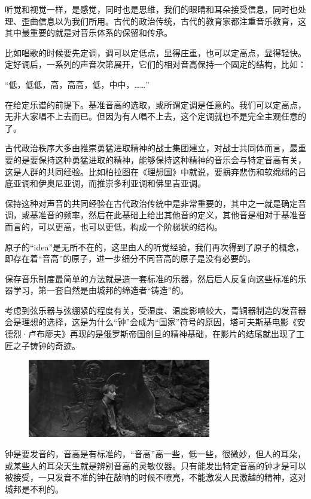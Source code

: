 听觉和视觉一样，是感觉，同时也是思维，我们的眼睛和耳朵接受信息，同时也处理、歪曲信息以为我们所用。古代的政治传统，古代的教育家都注重音乐教育，这其中最重要的就是对音乐体系的保留和传承。

比如唱歌的时候要先定调，调可以定低点，显得庄重，也可以定高点，显得轻快。定好调后，一系列的声音次第展开，它们的相对音高保持一个固定的结构，比如：

“低，低低，高，高高，低，中中，……”

在给定乐谱的前提下。基准音高的选取，或所谓定调是任意的。我们可以定高点，无非大家唱不上去而已。但因为有人唱不上去，这个定调就也不是完全主观任意的了。

古代政治秩序大多由推崇勇猛进取精神的战士集团建立，对战士共同体而言，最重要的是要保持这种勇猛进取的精神，能够保持这种精神的音乐会与特定音高有关，这是人群的共同经验。比如柏拉图在《理想国》中就说，要摒弃悲伤和软绵绵的吕底亚调和伊奥尼亚调，而推崇多利亚调和佛里吉亚调。

保持这种对声音的共同经验在古代政治传统中是非常重要的，其中之一就是确定音调，或基准音的频率，然后在此基础上给出其他音的定义，其他音是相对于基准音而言的，可以更高，也可以更低，构成一个阶梯状的结构。

原子的“idea”是无所不在的，这里由人的听觉经验，我们再次得到了原子的概念，即存在着“音高”的原子，进一步细分不同音高的原子是没有必要的。

保存音乐制度最简单的方法就是造一套标准的乐器，然后后人反复向这些标准的乐器学习，第一套自然是由城邦的缔造者“铸造”的。

考虑到弦乐器与弦绷紧的程度有关，受湿度、温度影响较大，青铜器制造的发音器会是理想的选择，这是为什么“钟”会成为“国家”符号的原因，塔可夫斯基电影《安德烈·卢布廖夫》再现的是俄罗斯帝国创旦的精神基础，在影片的结尾就出现了工匠之子铸钟的奇迹。

\begin{figure}[htbp]
\begin{center}
\includegraphics[width=8cm]{Preface/st_george_bell.jpg}
\end{center}
\end{figure}

钟是要发音的，音高是有标准的，“音高”高一些，低一些，很微妙，但人的耳朵，或某些人的耳朵天生就是辨别音高的灵敏仪器。只有能发出特定音高的钟才是可以被接受，一只发音不准的钟在敲响的时候不嘹亮，不能激发人民激越的精神，这对城邦是不利的。

